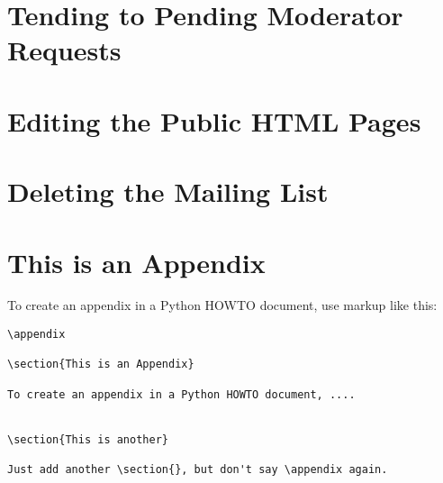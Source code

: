 \documentclass{howto}
\begin{document}
\section{Tending to Pending Moderator Requests}
\section{Editing the Public HTML Pages}
\section{Deleting the Mailing List}

\appendix

\section{This is an Appendix}

To create an appendix in a Python HOWTO document, use markup like
this:

\begin{verbatim}
\appendix

\section{This is an Appendix}

To create an appendix in a Python HOWTO document, ....


\section{This is another}

Just add another \section{}, but don't say \appendix again.
\end{verbatim}
\end{document}
